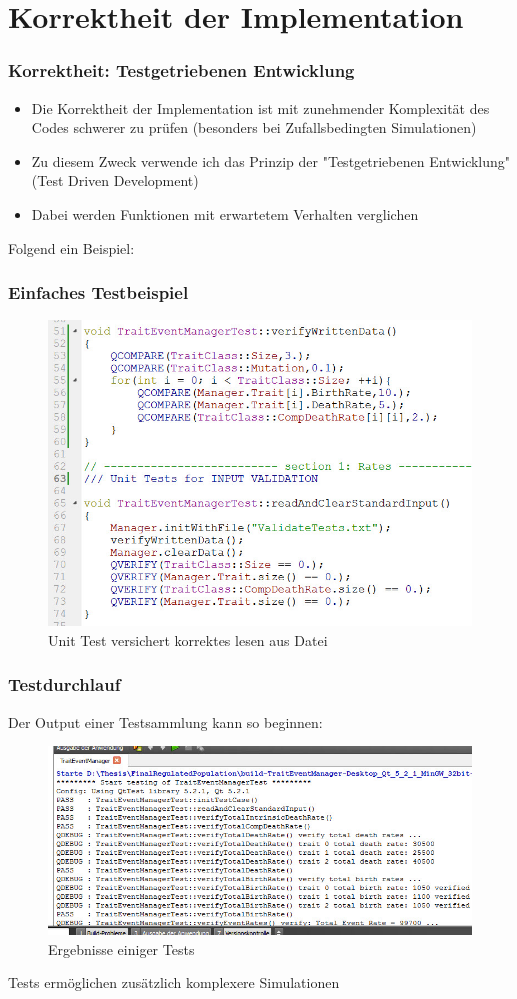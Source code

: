 \documentclass{beamer}
\begin{document}
\section{Korrektheit der Implementation}
	\begin{frame}
		\frametitle{Korrektheit: Testgetriebenen Entwicklung}
		\pause
		\begin{itemize}
			\item Die Korrektheit der Implementation ist mit zunehmender Komplexität des Codes schwerer zu prüfen (besonders bei Zufallsbedingten Simulationen)
			\pause
			\item Zu diesem Zweck verwende ich das Prinzip der "Testgetriebenen Entwicklung" (Test Driven Development)
			\pause
			\item Dabei werden Funktionen mit erwartetem Verhalten verglichen
		\end{itemize}
		\pause
		Folgend ein Beispiel:
	\end{frame}
	\begin{frame}
		\frametitle{Einfaches Testbeispiel}
		\begin{figure}[H]
			\centering
			\includegraphics[width=0.85\linewidth]{./UnitTest}
			\caption[UnitTest]{Unit Test versichert korrektes lesen aus Datei}
			\label{Unit Test}
		\end{figure}
	\end{frame}
	\begin{frame}
		\frametitle{Testdurchlauf}
		Der Output einer Testsammlung kann so beginnen:
		\pause
		\begin{figure}[H]
			\centering
			\includegraphics[width=0.9\linewidth]{./TestResult_start}
			\caption[Test Resultat einer Test Datei]{Ergebnisse einiger Tests}
			\label{Test Results}
		\end{figure}
		\pause
		Tests ermöglichen zusätzlich komplexere Simulationen
	\end{frame}
\end{document}
